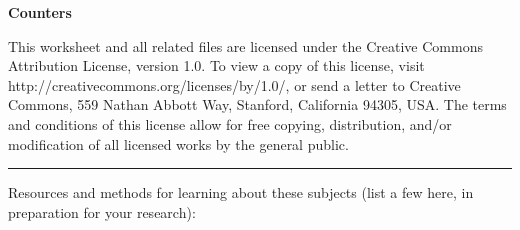 
\centerline{\bf Counters} \bigskip 
 
This worksheet and all related files are licensed under the Creative Commons Attribution License, version 1.0.  To view a copy of this license, visit http://creativecommons.org/licenses/by/1.0/, or send a letter to Creative Commons, 559 Nathan Abbott Way, Stanford, California 94305, USA.  The terms and conditions of this license allow for free copying, distribution, and/or modification of all licensed works by the general public.

\bigskip 

\hrule

\vskip 10pt

Resources and methods for learning about these subjects (list a few here, in preparation for your research):

